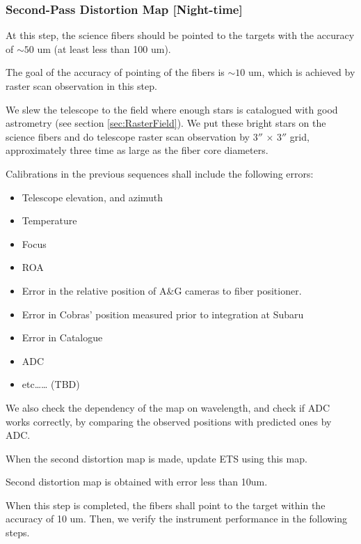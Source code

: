 \subsubsection{Second-Pass Distortion Map [Night-time]}\label{secflow:raster}

At this step, the science fibers should be pointed to the targets with the accuracy of $\sim 50$ um (at least less than 100 um).

The goal of the accuracy of pointing of the fibers is $\sim 10$ um, which is achieved by raster scan observation in this step.

We slew the telescope to the field where enough stars is catalogued with good astrometry (see section \ref{sec:RasterField}).
We put these bright stars on the science fibers and do telescope raster scan observation by 3$''$ $\times$ 3$''$ grid, approximately three time as large as the fiber core diameters.

Calibrations in the previous sequences shall include the following errors:
\begin{itemize}
\item Telescope elevation, and azimuth
\item Temperature
\item Focus
\item ROA
\item Error in the relative position of A\&G cameras to fiber positioner.
\item Error in Cobras' position measured prior to integration at Subaru
\item Error in Catalogue
\item ADC
\item etc…… (TBD)
\end{itemize}

We also check the dependency of the map on wavelength, and check if ADC works correctly, by comparing the observed positions with predicted ones by ADC.

When the second distortion map is made, update ETS using this map.


\begin{itembox}[l]{}
Second distortion map is obtained with error less than 10um.

\end{itembox}

When this step is completed, the fibers shall point to the target within the accuracy of 10 um.
Then, we verify the instrument performance in the following steps. 
